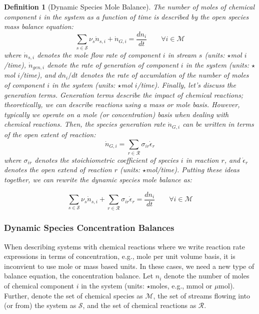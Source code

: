 \documentclass{article}[11pt]
\newtheorem{defn}{Definition}
\begin{document}
\begin{defn}[Dynamic Species Mole Balance]\label{defn-dynamic-species-mole-balance}
The number of moles of chemical component $i$ in the system as a function of time is described by the 
open species mass balance equation:
\begin{equation}\label{eqn-species-mol-balance}
\sum_{s\in\mathcal{S}}\nu_{s}\dot{n}_{s,i} + \dot{n}_{G,i} = \frac{dn_{i}}{dt}
\qquad\forall{i}\in\mathcal{M}
\end{equation}
where $\dot{n}_{s,i}$ denotes the mole flow rate of component $i$ in stream $s$ (units: $\star$mol $i$/time),
$\dot{n}_{gen,i}$ denote the rate of generation of component $i$ in the system 
(units: $\star$mol $i$/time), and $dn_{i}/dt$ denotes the rate of accumlation of the number of moles of component $i$ in the system (units: $\star$mol $i$/time). 
Finally, let's discuss the generation terms. Generation terms describe the impact of chemical reactions; theoretically, we can describe reactions using a mass or mole basis. 
However, typically we operate on a mole (or concentration) basis when dealing with chemical reactions.
Then, the species generation rate $\dot{n}_{G,i}$ can be written in terms of the open extent of reaction:
\begin{equation}\label{eqn-open-extent-species}
\dot{n}_{G,i} = \sum_{r\in\mathcal{R}}\sigma_{ir}\dot{\epsilon}_{r}
\end{equation}
where $\sigma_{ir}$ denotes the stoichiometric coefficient of species $i$ in reaction $r$, and $\dot{\epsilon}_{r}$ denotes the open extend of reaction $r$ (units: $\star$mol/time).
Putting these ideas together, we can rewrite the dynamic species mole balance as:
\begin{mdframed}[backgroundcolor=lgray]
\begin{equation}\label{eqn-dynamic-smb-with-extent}
\sum_{s\in\mathcal{S}}\nu_{s}\dot{n}_{s,i} + \sum_{r\in\mathcal{R}}\sigma_{ir}\dot{\epsilon}_{r} = \frac{dn_{i}}{dt}\qquad\forall{i\in\mathcal{M}}
\end{equation}
\end{mdframed}
\end{defn}

\subsubsection*{Dynamic Species Concentration Balances}
When describing systems with chemical reactions where we write reaction rate expressions in terms of 
concentration, e.g., mole per unit volume basis, it is inconvient to use mole or mass based units.
In these cases, we need a new type of balance equation, the concentration balance. 
Let $n_{i}$ denote the number of moles of chemical component $i$ in the system (units: $\star$moles, e.g., mmol or  $\mu$mol). 
Further, denote the set of chemical species as $\mathcal{M}$, the set of streams flowing into (or from) the system as $\mathcal{S}$, and the set of chemical reactions as $\mathcal{R}$.
\end{document}
